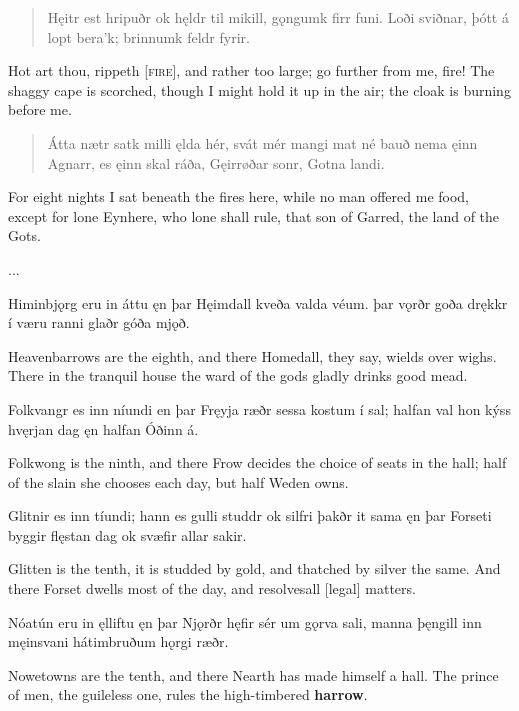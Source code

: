 \bookStart

\begin{verse}
\bva Hęitr est hripuðr \hld ok hęldr til mikill,
\ind gǫngumk firr funi.
Loði sviðnar, \hld þótt á lopt bera'k;
\ind brinnumk feldr fyrir. 
\end{verse}

\bvb Hot art thou, rippeth [\textsc{fire}], and rather too large; go further from me, fire! The shaggy cape is scorched, though I might hold it up in the air; the cloak is burning before me.

\begin{verse}
\bva Átta nætr satk \hld milli ęlda hér,
\ind svát mér mangi mat né bauð
nema ęinn Agnarr, \hld es ęinn skal ráða,
\ind Gęirrøðar sonr, Gotna landi.
\end{verse}

\bvb For eight nights I sat beneath the fires here, while no man offered me food, except for lone Eynhere, who lone shall rule, that son of Garred, the land of the Gots.

...

Himinbjǫrg eru in áttu \hld ęn þar Hęimdall
\ind kveða valda véum.
þar vǫrðr goða \hld drękkr í væru ranni
\ind glaðr góða mjǫð. 

\bvb Heavenbarrows are the eighth, and there Homedall, they say, wields over wighs. There in the tranquil house the ward of the gods gladly drinks good mead.

Folkvangr es inn níundi \hld en þar Fręyja ræðr
\ind sessa kostum í sal;
halfan val \hld hon kýss hvęrjan dag
\ind ęn halfan Óðinn á. 

\bvb Folkwong is the ninth, and there Frow decides the choice of seats in the hall; half of the slain she chooses each day, but half Weden owns.

Glitnir es inn tíundi; \hld hann es gulli studdr
\ind ok silfri þakðr it sama
ęn þar Forseti \hld byggir flęstan dag
\ind ok svæfir allar sakir. 

\bvb Glitten is the tenth, it is studded by gold, and thatched by silver the same. And there Forset dwells most of the day, and resolves\footnotemark[1] all [legal] matters.

Nóatún eru in ęlliftu \hld ęn þar Njǫrðr hęfir
\ind sér um gǫrva sali,
manna þęngill \hld inn męinsvani
\ind hátimbruðum hǫrgi ræðr. 

\bvb Nowetowns are the tenth, and there Nearth has made himself a hall. The prince of men, the guileless one, rules the high-timbered \textbf{harrow}.

